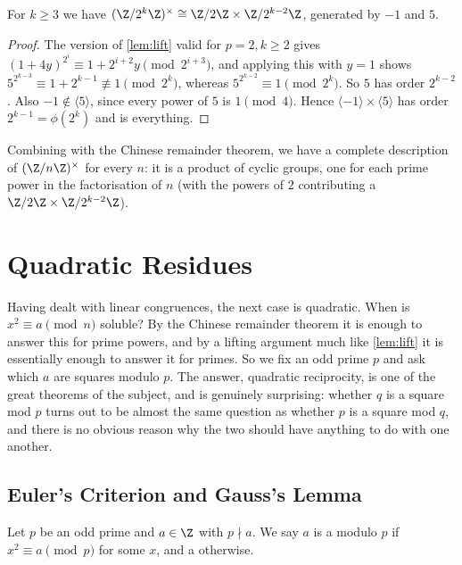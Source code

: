 \begin{proposition}
	For $k \geq 3$ we have $(\Z/2^k\Z)^\times \cong \Z/2\Z \times \Z/2^{k-2}\Z$, generated by $-1$ and $5$.
\end{proposition}
\begin{proof}
	The version of \autoref{lem:lift} valid for $p = 2, k \geq 2$ gives $(1 + 4y)^{2^i} \equiv 1 + 2^{i+2}y \pmod{2^{i+3}}$, and applying this with $y = 1$ shows $5^{2^{k-3}} \equiv 1 + 2^{k-1} \not\equiv 1 \pmod{2^k}$, whereas $5^{2^{k-2}} \equiv 1 \pmod{2^k}$. So $5$ has order $2^{k-2}$. Also $-1 \notin \langle 5 \rangle$, since every power of $5$ is $1 \pmod 4$. Hence $\langle -1 \rangle \times \langle 5 \rangle$ has order $2^{k-1} = \phi(2^k)$ and is everything.
\end{proof}

Combining with the Chinese remainder theorem, we have a complete description of $(\Z/n\Z)^\times$ for every $n$: it is a product of cyclic groups, one for each prime power in the factorisation of $n$ (with the powers of $2$ contributing a $\Z/2\Z \times \Z/2^{k-2}\Z$).

\section{Quadratic Residues}

Having dealt with linear congruences, the next case is quadratic. When is $x^2 \equiv a \pmod n$ soluble? By the Chinese remainder theorem it is enough to answer this for prime powers, and by a lifting argument much like \autoref{lem:lift} it is essentially enough to answer it for primes. So we fix an odd prime $p$ and ask which $a$ are squares modulo $p$. The answer, quadratic reciprocity, is one of the great theorems of the subject, and is genuinely surprising: whether $q$ is a square mod $p$ turns out to be almost the same question as whether $p$ is a square mod $q$, and there is no obvious reason why the two should have anything to do with one another.

\subsection{Euler's Criterion and Gauss's Lemma}

\begin{definition}
	Let $p$ be an odd prime and $a \in \Z$ with $p \nmid a$. We say $a$ is a  modulo $p$ if $x^2 \equiv a \pmod p$ for some $x$, and a  otherwise.
\end{definition}

